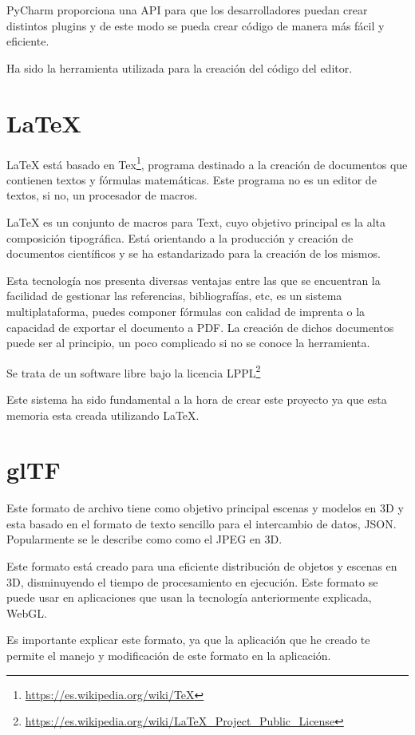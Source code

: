\documentclass[a4paper, 12pt]{book}
\begin{document}
PyCharm proporciona una API para que los desarrolladores puedan crear distintos plugins y de este modo se pueda crear código de manera más fácil y eficiente.

Ha sido la herramienta utilizada para la creación del código del editor.

\section{LaTeX} %
\label{sec:Latex}
LaTeX está basado en Tex\footnote{\url{https://es.wikipedia.org/wiki/TeX}}, programa destinado a la creación de documentos que contienen textos y fórmulas matemáticas. Este programa no es un editor de textos, si no, un procesador de macros.

LaTeX es un conjunto de macros para Text, cuyo objetivo principal es la alta composición tipográfica. Está orientando a la producción y creación de documentos científicos y se ha estandarizado para la creación de los mismos.

Esta tecnología nos presenta diversas ventajas entre las que se encuentran la facilidad de gestionar las referencias, bibliografías, etc, es un sistema multiplataforma, puedes componer fórmulas con calidad de imprenta o la capacidad de exportar el documento a PDF. La creación de dichos documentos puede ser al principio, un poco complicado si no se conoce la herramienta.

Se trata de un software libre bajo la licencia LPPL\footnote{\url{https://es.wikipedia.org/wiki/LaTeX_Project_Public_License}} 

Este sistema ha sido fundamental a la hora de crear este proyecto ya que esta memoria esta creada utilizando LaTeX.

\section{glTF} %
\label{sec:Gltfs}
Este formato de archivo tiene como objetivo principal escenas y modelos en 3D y esta basado en el formato de texto sencillo para el intercambio de datos, JSON. Popularmente se le describe como como el JPEG en 3D.

Este formato está creado para una eficiente distribución de objetos y escenas en 3D, disminuyendo el tiempo de procesamiento en ejecución. Este formato se puede usar en aplicaciones que usan la tecnología anteriormente explicada, WebGL.

Es importante explicar este formato, ya que la aplicación que he creado te permite el manejo y  modificación de este formato en la aplicación.
\end{document}

